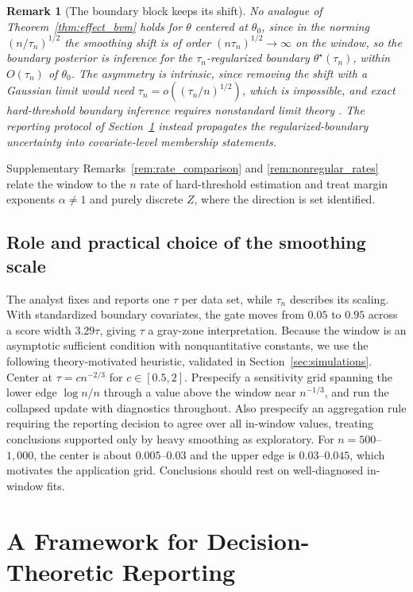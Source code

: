 \documentclass[11pt]{article}
\theoremstyle{definition}
\theoremstyle{plain}
\newtheorem{remark}{Remark}
\begin{document}
\begin{remark}[The boundary block keeps its shift]
\label{rem:boundary_shift}
No analogue of Theorem~\ref{thm:effect_bvm} holds for $\theta$ centered at $\theta_0$, since in the norming $(n/\tau_n)^{1/2}$ the smoothing shift is of order $(n\tau_n)^{1/2}\to\infty$ on the window, so the boundary posterior is inference for the $\tau_n$-regularized boundary $\theta^\star(\tau_n)$, within $O(\tau_n)$ of $\theta_0$. The asymmetry is intrinsic, since removing the shift with a Gaussian limit would need $\tau_n=o((\tau_n/n)^{1/2})$, which is impossible, and exact hard-threshold boundary inference requires nonstandard limit theory \citep{ChernozhukovHong2004,Yu2012,SeoLinton2007}. The reporting protocol of Section~\ref{sec:reporting_protocol} instead propagates the regularized-boundary uncertainty into covariate-level membership statements.
\end{remark}

Supplementary Remarks~\ref{rem:rate_comparison} and \ref{rem:nonregular_rates} relate the window to the $n$ rate of hard-threshold estimation \citep{Kang2025} and treat margin exponents $\alpha\neq1$ and purely discrete $Z$, where the direction is set identified.

\subsection{Role and practical choice of the smoothing scale}
\label{sec:choice_tau}

The analyst fixes and reports one $\tau$ per data set, while $\tau_n$ describes its scaling. With standardized boundary covariates, the gate moves from $0.05$ to $0.95$ across a score width $3.29\tau$, giving $\tau$ a gray-zone interpretation. Because the window is an asymptotic sufficient condition with nonquantitative constants, we use the following theory-motivated heuristic, validated in Section~\ref{sec:simulations}. Center at $\tau=c n^{-2/3}$ for $c\in[0.5,2]$. Prespecify a sensitivity grid spanning the lower edge $\log n/n$ through a value above the window near $n^{-1/3}$, and run the collapsed update with diagnostics throughout. Also prespecify an aggregation rule requiring the reporting decision to agree over all in-window values, treating conclusions supported only by heavy smoothing as exploratory. For $n=500$--$1{,}000$, the center is about $0.005$--$0.03$ and the upper edge is $0.03$--$0.045$, which motivates the application grid. Conclusions should rest on well-diagnosed in-window fits.
\section{A Framework for Decision-Theoretic Reporting}
\label{sec:reporting_protocol}
\end{document}
